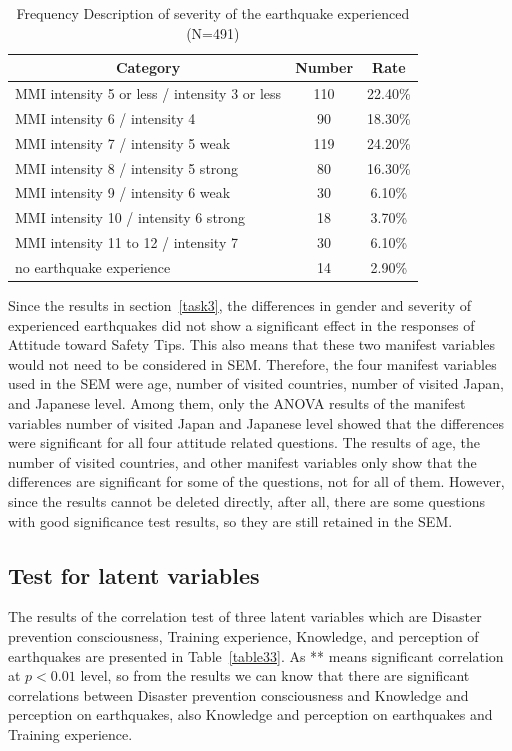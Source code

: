 \begin{table}[h]
  \caption[Frequency Description of severity of the earthquake experienced]{Frequency Description of severity of the earthquake experienced (N=491)}
  \label{table28g}
  \centering
  \begin{tabular}{l|cc}
 \hline
\multicolumn{1}{c|}{Category}&Number&Rate\\
 \hline
MMI intensity 5 or less / intensity 3 or less & 110 & 22.40\% \\
MMI intensity 6 / intensity 4                 & 90  & 18.30\% \\
MMI intensity 7 / intensity 5 weak            & 119 & 24.20\% \\
MMI intensity 8 / intensity 5 strong          & 80  & 16.30\% \\
MMI intensity 9 / intensity 6 weak            & 30  & 6.10\%  \\
MMI intensity 10 / intensity 6 strong                                 & 18  & 3.70\%  \\
MMI intensity 11 to 12 / intensity 7                                  & 30  & 6.10\%  \\
no earthquake experience                                              & 14  & 2.90\%  \\
 \hline
  \end{tabular}
\end{table}

Since the results in section~\ref{task3}, the differences in gender and severity of experienced earthquakes did not show a significant effect in the responses of Attitude toward Safety Tips. This also means that these two manifest variables would not need to be considered in SEM. Therefore, the four manifest variables used in the SEM were age, number of visited countries, number of visited Japan, and Japanese level. Among them, only the ANOVA results of the manifest variables number of visited Japan and Japanese level showed that the differences were significant for all four attitude related questions. The results of age, the number of visited countries, and other manifest variables only show that the differences are significant for some of the questions, not for all of them. However, since the results cannot be deleted directly, after all, there are some questions with good significance test results, so they are still retained in the SEM.

\subsection{Test for latent variables }
The results of the correlation test of three latent variables which are Disaster prevention consciousness, Training experience, Knowledge, and perception of earthquakes are presented in Table~\ref{table33}. As ** means significant correlation at $p<0.01$ level, so from the results we can know that there are significant correlations between Disaster prevention consciousness and Knowledge and perception on earthquakes, also Knowledge and perception on earthquakes and Training experience.

